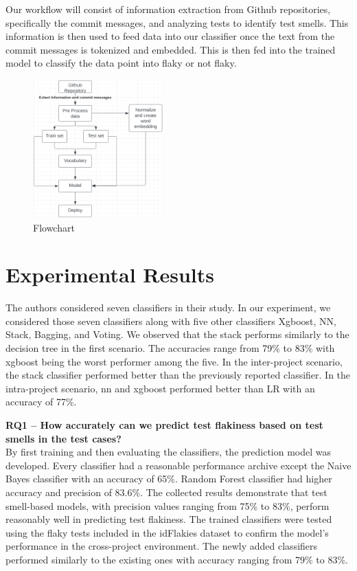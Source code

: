 \documentclass[sigconf,review]{acmart}
\begin{document}
Our workflow will consist of information extraction from Github repositories, specifically the commit messages, and analyzing tests to identify test smells. This information is then used to feed data into our classifier once the text from the commit messages is tokenized and embedded. This is then fed into the trained model to classify the data point into flaky or not flaky.
 \begin{figure}
     \centering
     \includegraphics[width=5cm]{Flowchart.png}
     \caption{Flowchart}
     \label{fig:my_label}
 \end{figure}
 
\section{Experimental Results}
\label{Section: Result} 

The authors considered seven classifiers in their study. In our experiment, we considered those seven classifiers along with five other classifiers Xgboost, NN, Stack, Bagging, and Voting. We observed that the stack performs similarly to the decision tree in the first scenario. The accuracies range from 79\% to 83\% with xgboost being the worst performer among the five. In the inter-project scenario, the stack classifier performed better than the previously reported classifier. In the intra-project scenario, nn and xgboost performed better than LR with an accuracy of 77\%.

 \textbf{ RQ1 – How accurately can we predict test flakiness based on test smells in the test cases?}
\\
By first training and then evaluating the classifiers, the prediction model was developed. Every classifier had a reasonable performance archive except the Naive Bayes classifier with an accuracy of 65\%. Random Forest classifier had higher accuracy and precision of 83.6\%.
The collected results demonstrate that test smell-based models, with precision values ranging from 75\% to 83\%, perform reasonably well in predicting test flakiness. The trained classifiers were tested using the flaky tests included in the idFlakies dataset to confirm the model’s performance in the cross-project environment. The newly added classifiers performed similarly to the existing ones with accuracy ranging from 79\% to 83\%.
\end{document}

